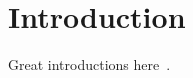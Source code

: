 \section{Introduction}\label{sec:introduction}

Great introductions here~\cite{CERN-LHCC-2022-005,nanobind}.
